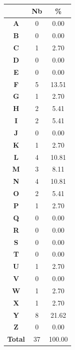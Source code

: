 \documentclass[a4paper, titlepage]{livret}
\begin{document}
\begin{minipage}[c]{.3\linewidth}
  \begin{tabular}{|c|c|c|}
    \hline
	& \textbf{Nb} & \textbf{\%}\\
	 \hline
	\textbf{A} &       0 &  0.00\\
	\hline
	\textbf{B} &       0 &  0.00\\
	\hline
	\textbf{C} &       1 &  2.70\\
	\hline
	\textbf{D} &       0 &  0.00\\
	\hline
	\textbf{E} &       0 &  0.00\\
	\hline
	\textbf{F} &       5 &  13.51\\
	\hline
	\textbf{G} &       1 &  2.70\\
	\hline
	\textbf{H} &       2 &  5.41\\
	\hline
	\textbf{I} &       2 &  5.41\\
	\hline
	\textbf{J} &       0 &  0.00\\
	\hline
	\textbf{K} &       1 &  2.70\\
	\hline
	\textbf{L} &       4 &  10.81\\
	\hline
	\textbf{M} &       3 &  8.11\\
	\hline
	\textbf{N} &       4 &  10.81\\
	\hline
	\textbf{O} &       2 &  5.41\\
	\hline
	\textbf{P} &       1 &  2.70\\
	\hline
	\textbf{Q} &       0 &  0.00\\
	\hline
	\textbf{R} &       0 &  0.00\\
	\hline
	\textbf{S} &       0 &  0.00\\
	\hline
	\textbf{T} &       0 &  0.00\\
	\hline
	\textbf{U} &       1 &  2.70\\
	\hline
	\textbf{V} &       0 &  0.00\\
	\hline
	\textbf{W} &       1 &  2.70\\
	\hline
	\textbf{X} &       1 &  2.70\\
	\hline
	\textbf{Y} &       8 &  21.62\\
	\hline
	\textbf{Z} &       0 &  0.00\\
	\hline
	\textbf{Total} &      37 &  100.00\\
	\hline
  \end{tabular}
  \label{tab8}
  \end{minipage} \hfill
\end{document}

